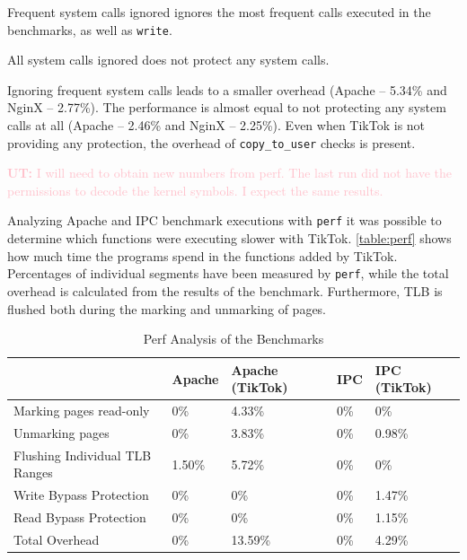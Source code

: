 \documentclass[conference]{IEEEtran}
\newcommand{\uros}[1]{\textcolor{pink}{\textbf{UT:} #1}}
\newcommand{\sysname}{TikTok}
\begin{document}
\begin{LaTeXdescription}
  \item[Frequent system calls ignored] ignores the most frequent calls executed in the benchmarks, as well as \texttt{write}.
  \item[All system calls ignored] does not protect any system calls.
\end{LaTeXdescription}

Ignoring frequent system calls leads to a smaller overhead (Apache -- 5.34\% and
NginX -- 2.77\%). The performance is almost equal to not protecting any system
calls at all (Apache -- 2.46\% and NginX -- 2.25\%). Even when \sysname
is not providing any protection, the overhead of \texttt{copy\_to\_user} checks
is present.

\uros{I will need to obtain new numbers from perf. The last run did not have the
permissions to decode the kernel symbols. I expect the same results.}

Analyzing Apache and IPC benchmark executions with \texttt{perf} it was possible
to determine which functions were executing slower with TikTok.
\autoref{table:perf} shows how much time the programs spend in the functions added
by \sysname. Percentages of individual segments have been measured by
\texttt{perf}, while the total overhead is calculated from the results of the
benchmark. Furthermore, TLB is flushed both during the marking and unmarking of
pages.

\begin{table}[]
  \label{table:perf}
  \centering
  \begin{tabular}{|l|l|l|l|l|}
  \hline
                                 & Apache & Apache (TikTok) & IPC & IPC (TikTok)\\ \hline
  Marking pages read-only        & 0\%    & 4.33\%          & 0\% & 0\%         \\ \hline
  Unmarking pages                & 0\%    & 3.83\%          & 0\% & 0.98\%      \\ \hline
  Flushing Individual TLB Ranges & 1.50\% & 5.72\%          & 0\% & 0\%         \\ \hline
  Write Bypass Protection        & 0\%    & 0\%             & 0\% & 1.47\%      \\ \hline
  Read Bypass Protection         & 0\%    & 0\%             & 0\% & 1.15\%      \\ \hline
  Total Overhead                 & 0\%    & 13.59\%         & 0\% & 4.29\%      \\ \hline
  \end{tabular}
  \caption{Perf Analysis of the Benchmarks}
\end{table}
\end{document}
